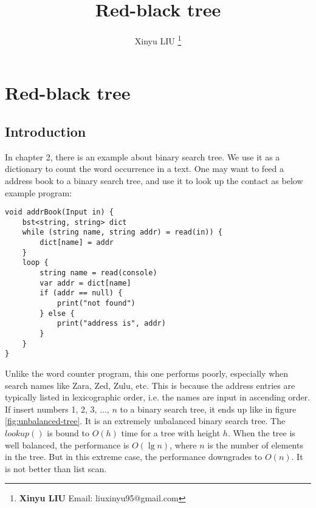 \documentclass[b5paper]{article}
\begin{document}
\title{Red-black tree}

\author{Xinyu LIU
\thanks{{\bfseries Xinyu LIU} \newline
  Email: liuxinyu95@gmail.com \newline}
  }

\maketitle
\fi


\ifx\wholebook\relax
\chapter{Red-black tree}
\fi

\section{Introduction}
\label{sec:rbtree-introduction} 

In chapter 2, there is an example about binary search tree. We use it as a dictionary to count the word occurrence in a text. One may want to feed a address book to a binary search tree, and use it to look up the contact as below example program:

\lstset{frame = single}
\begin{lstlisting}[language=Bourbaki]
void addrBook(Input in) {
    bst<string, string> dict
    while (string name, string addr) = read(in)) {
        dict[name] = addr
    }
    loop {
        string name = read(console)
        var addr = dict[name]
        if (addr == null) {
            print("not found")
        } else {
            print("address is", addr)
        }
    }
}
\end{lstlisting}

Unlike the word counter program, this one performs poorly, especially when search names like Zara, Zed, Zulu, etc. This is because the address entries are typically listed in lexicographic order, i.e. the names are input in ascending order. If insert numbers 1, 2, 3, ..., $n$ to a binary search tree, it ends up like in figure \ref{fig:unbalanced-tree}. It is an extremely unbalanced binary search tree. The $lookup()$ is bound to $O(h)$ time for a tree with height $h$. When the tree is well balanced, the performance is $O(\lg n)$, where $n$ is the number of elements in the tree. But in this extreme case, the performance downgrades to $O(n)$. It is not better than list scan.
\end{document}
